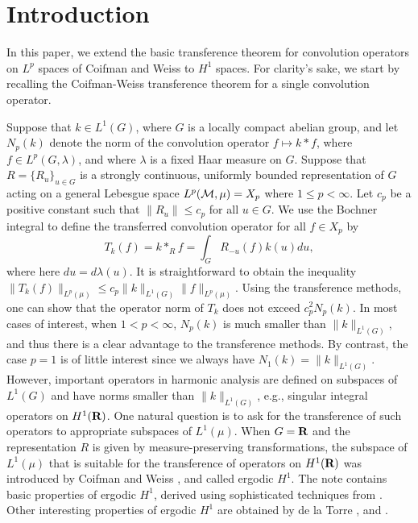 
\section{Introduction}

In this paper, we extend
the basic transference theorem for
convolution operators on $L^p$ spaces of
Coifman and Weiss \cite{cw1}
to $H^1$ spaces.  For clarity's sake, we start 
by recalling the Coifman-Weiss
transference theorem for a single convolution
operator.  

Suppose that $k\in L^1(G)$,
where $G$ is a locally compact 
abelian group,
and let $N_p(k)$
denote the norm of the convolution
operator $f\mapsto k*f$,
where $f\in L^p(G,\lambda)$, and
where
$\lambda$ is a fixed Haar measure on $G$.  
Suppose that $R=\{R_u\}_{u\in G}$
is a strongly continuous, uniformly bounded representation
of $G$ acting on a general 
Lebesgue space $L^p({\cal M},\mu)=X_p$
where $1\leq p<\infty$.
Let $c_p$ be a positive constant such that
$\|R_u\|\leq c_p$ for all $u\in G$.
We use the Bochner integral to define the
transferred convolution operator for all $f\in X_p$
by
$$T_k(f)=k*_Rf=\int_G R_{-u}(f) k(u) du,$$
where here $du=d\lambda (u)$.
It is straightforward to obtain the inequality
$\|T_k(f)\|_{L^p(\mu)}\leq 
c_p\|k\|_{L^1(G)} \|f\|_{L^p(\mu)}$.
Using the transference methods,
one can show that the operator norm
of $T_k$ does not exceed $c_p^2 N_p(k)$.  
In most cases of interest,
when $1<p<\infty$,  $N_p(k)$ is much smaller
than $\|k\|_{L^1(G)}$, and thus 
there is a clear 
advantage to the transference methods.
By contrast, the case $p=1$ is of little interest since 
we always have $N_1(k)=\|k\|_{L^1(G)}$. 
%
However, important operators in harmonic analysis
are defined on subspaces of $L^1(G)$ and have norms
smaller than $\|k\|_{L^1(G)}$, e.g.,
singular integral operators
on $H^1(\R)$. 
%
One natural question is to ask for the transference
of such operators to appropriate subspaces of $L^1(\mu)$.
When $G=\R$ and
the representation $R$ is given by measure-preserving
transformations, the subspace of $L^1(\mu)$ that is suitable for the
transference of operators on $H^1(\R)$ was introduced 
 by Coifman and Weiss \cite{cw2}, and called ergodic $H^1$.
The note \cite{cw2} contains basic properties of
ergodic $H^1$, derived using 
sophisticated techniques from
\cite{fs}.
Other interesting properties of ergodic $H^1$
are obtained by de la Torre \cite{dlt}, and \cite{abg2}.

